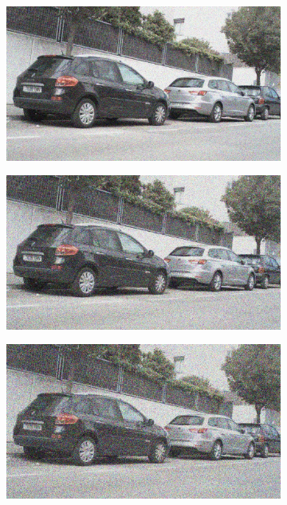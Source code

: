 \documentclass[a4paper]{ctexart}
\begin{document}
\begin{figure}[htbp]
\begin{subfigure}{0.08\textwidth}
			\label{fig：Gamma=1.0, Gauss Noise = 0.1}
		\end{subfigure}
		\begin{subfigure}{0.08\textwidth}
			\captionsetup{font=scriptsize}
			\includegraphics[width=\linewidth]{picture/Edge Detection/degrade/RGB_001 Gamma=1.0, Gauss Noise=0.2}
			\label{fig：Gamma=1.0, Gauss Noise = 0.2}
		\end{subfigure}
		\begin{subfigure}{0.08\textwidth}
			\captionsetup{font=scriptsize}
			\includegraphics[width=\linewidth]{picture/Edge Detection/degrade/RGB_001 Gamma=1.0, Gauss Noise=0.3}
			\label{fig：Gamma=1.0, Gauss Noise = 0.3}
		\end{subfigure}
		\begin{subfigure}{0.08\textwidth}
			\captionsetup{font=scriptsize}
			\includegraphics[width=\linewidth]{picture/Edge Detection/degrade/RGB_001 Gamma=1.0, Gauss Noise=0.4}

\end{subfigure}
\end{figure}
\end{document}
